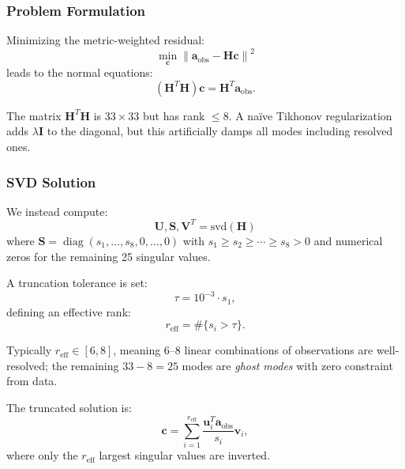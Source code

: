 \documentclass[11pt,a4paper]{article}
\begin{document}
\subsubsection{Problem Formulation}

Minimizing the metric-weighted residual:
\begin{equation}
\min_{\mathbf{c}} \left\| \mathbf{a}_{\mathrm{obs}} - \mathbf{H} \mathbf{c} \right\|^2
\end{equation}
leads to the normal equations:
\begin{equation}
\left( \mathbf{H}^T \mathbf{H} \right) \mathbf{c} = \mathbf{H}^T \mathbf{a}_{\mathrm{obs}}.
\label{eq:normal}
\end{equation}

The matrix $\mathbf{H}^T \mathbf{H}$ is $33 \times 33$ but has rank $\leq 8$. A na\"ive Tikhonov regularization adds $\lambda \mathbf{I}$ to the diagonal, but this artificially damps all modes including resolved ones.

\subsubsection{SVD Solution}

We instead compute:
\begin{equation}
\mathbf{U}, \mathbf{S}, \mathbf{V}^T = \text{svd}(\mathbf{H})
\label{eq:svd}
\end{equation}
where $\mathbf{S} = \operatorname{diag}(s_1, \ldots, s_8, 0, \ldots, 0)$ with $s_1 \geq s_2 \geq \cdots \geq s_8 > 0$ and numerical zeros for the remaining 25 singular values.

A truncation tolerance is set:
\begin{equation}
\tau = 10^{-3} \cdot s_1,
\end{equation}
defining an effective rank:
\begin{equation}
r_{\mathrm{eff}} = \#\{s_i > \tau\}.
\end{equation}

Typically $r_{\mathrm{eff}} \in [6, 8]$, meaning 6--8 linear combinations of observations are well-resolved; the remaining $33 - 8 = 25$ modes are \emph{ghost modes} with zero constraint from data.

The truncated solution is:
\begin{equation}
\mathbf{c} = \sum_{i=1}^{r_{\mathrm{eff}}} \frac{\mathbf{u}_i^T \mathbf{a}_{\mathrm{obs}}}{s_i} \mathbf{v}_i,
\label{eq:svd_solution}
\end{equation}
where only the $r_{\mathrm{eff}}$ largest singular values are inverted.
\end{document}
